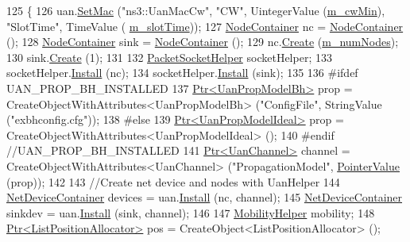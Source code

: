 \begin{DoxyCode}
125 \{
126   uan.\hyperlink{classns3_1_1UanHelper_a1c99a2afa329597107452c42eb9c43b9}{SetMac} (\textcolor{stringliteral}{"ns3::UanMacCw"}, \textcolor{stringliteral}{"CW"}, UintegerValue (\hyperlink{classNetAnimExperiment_a2d4b4380bbc3962d37415236ebc46f64}{m\_cwMin}), \textcolor{stringliteral}{"SlotTime"}, TimeValue (
      \hyperlink{classNetAnimExperiment_a8775f236cd5acfc6d68139e14d58f342}{m\_slotTime}));
127   \hyperlink{classns3_1_1NodeContainer}{NodeContainer} nc = \hyperlink{classns3_1_1NodeContainer}{NodeContainer} ();
128   \hyperlink{classns3_1_1NodeContainer}{NodeContainer} sink = \hyperlink{classns3_1_1NodeContainer}{NodeContainer} ();
129   nc.\hyperlink{classns3_1_1NodeContainer_a787f059e2813e8b951cc6914d11dfe69}{Create} (\hyperlink{classNetAnimExperiment_a829363fc981b850401bc71674534c447}{m\_numNodes});
130   sink.\hyperlink{classns3_1_1NodeContainer_a787f059e2813e8b951cc6914d11dfe69}{Create} (1);
131 
132   \hyperlink{classns3_1_1PacketSocketHelper}{PacketSocketHelper} socketHelper;
133   socketHelper.\hyperlink{classns3_1_1PacketSocketHelper_a33f449fee7fd10411949d17feba6d33e}{Install} (nc);
134   socketHelper.\hyperlink{classns3_1_1PacketSocketHelper_a33f449fee7fd10411949d17feba6d33e}{Install} (sink);
135 
136 \textcolor{preprocessor}{#ifdef UAN\_PROP\_BH\_INSTALLED}
137   \hyperlink{classns3_1_1Ptr}{Ptr<UanPropModelBh>} prop = CreateObjectWithAttributes<UanPropModelBh> (\textcolor{stringliteral}{"ConfigFile"}, 
      StringValue (\textcolor{stringliteral}{"exbhconfig.cfg"}));
138 \textcolor{preprocessor}{#else }
139   \hyperlink{classns3_1_1Ptr}{Ptr<UanPropModelIdeal>} prop = CreateObjectWithAttributes<UanPropModelIdeal> ();
140 \textcolor{preprocessor}{#endif //UAN\_PROP\_BH\_INSTALLED}
141   \hyperlink{classns3_1_1Ptr}{Ptr<UanChannel>} channel = CreateObjectWithAttributes<UanChannel> (\textcolor{stringliteral}{"PropagationModel"}, 
      \hyperlink{classns3_1_1PointerValue}{PointerValue} (prop));
142 
143   \textcolor{comment}{//Create net device and nodes with UanHelper}
144   \hyperlink{classns3_1_1NetDeviceContainer}{NetDeviceContainer} devices = uan.\hyperlink{classns3_1_1UanHelper_a283475798bb2df2ff11c53b68d2f1361}{Install} (nc, channel);
145   \hyperlink{classns3_1_1NetDeviceContainer}{NetDeviceContainer} sinkdev = uan.\hyperlink{classns3_1_1UanHelper_a283475798bb2df2ff11c53b68d2f1361}{Install} (sink, channel);
146 
147   \hyperlink{classns3_1_1MobilityHelper}{MobilityHelper} mobility;
148   \hyperlink{classns3_1_1Ptr}{Ptr<ListPositionAllocator>} pos = CreateObject<ListPositionAllocator> ();

\end{DoxyCode}
